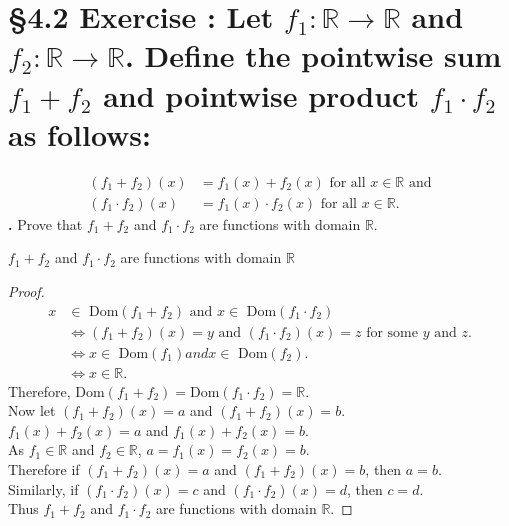 \documentclass[a4paper,11pt]{article}
\begin{document}
\section*{\S 4.2 Exercise : Let \(f_1:\mathbb{R} \rightarrow \mathbb{R}\) and \(f_2:\mathbb{R} \rightarrow \mathbb{R}\). Define the pointwise sum \(f_1 + f_2\) and pointwise product \(f_1 \cdot f_2\) as follows:}
\begin{align*}
  {(f_1 + f_2)}{(x)} &= f_1{(x)} + f_2{(x)} \text{ for all } x \in \mathbb{R} \text{ 
  and}\\
  {(f_1 \cdot f_2)}{(x)} &= f_1{(x)} \cdot f_2{(x)} \text{ for all } x \in 
  \mathbb{R}.
\end{align*}
\setcounter{SubsectionCounter}{1}
\textbf{.} Prove that \(f_1 + f_2\) 
and \(f_1 \cdot f_2\) are functions with domain \(\mathbb{R}\).
\begin{theorem1}
  \(f_1 + f_2\) 
and \(f_1 \cdot f_2\) are functions with domain \(\mathbb{R}\)
  \begin{proof}
    \begin{align*}
      x &\in \text{ Dom}{(f_1 + f_2)} \text{ and } x \in \text{ Dom}{(f_1 \cdot 
      f_2)}\\
      &\Leftrightarrow {(f_1 + f_2)}{(x)} = y \text{ and } {(f_1 \cdot f_2)}{(x)} 
      = z \text{ for some } y \text{ and } z.\\
      &\Leftrightarrow x \in \text{ Dom}{(f_1)} and x \in \text{ Dom}{(f_2)}.\\
      &\Leftrightarrow x \in \mathbb{R}.
    \end{align*}
    Therefore, Dom\({(f_1 + f_2)} = \text{Dom}{(f_1 \cdot f_2)}=\mathbb{R}\).\\
    Now let \({(f_1 + f_2)}{(x)} = a\) and \({(f_1 + f_2)}{(x)} = b\).\\
    \(f_1{(x)} + f_2{(x)} = a\) and \(f_1{(x)} + f_2{(x)} = b\).\\
    As \(f_1 \in \mathbb{R}\) and \(f_2 \in \mathbb{R}\), \(a = f_1{(x)} = f_2{(x)} = 
    b\).\\
    Therefore if \({(f_1 + f_2)}{(x)} = a\) and \({(f_1 + f_2)}{(x)} = b\), then 
    \(a = b\).\\
    Similarly, if \({(f_1 \cdot f_2)}{(x)} = c\) and \({(f_1 \cdot f_2)}{(x)} = d\), then 
    \(c = d\).\\
    Thus \(f_1 + f_2\) and \(f_1 \cdot f_2\) are functions with domain 
    \(\mathbb{R}\).
  \end{proof}
\end{theorem1}
\end{document}

